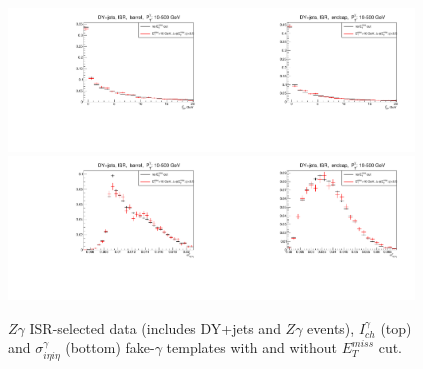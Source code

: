 \begin{figure}[htb]
  \begin{center}
  \includegraphics[width=0.48\textwidth]{../figs/figs_v11/ChannelsMERGED_ZGamma/QuickChecks/cTemplatesVsWMt_ZjetsISR_phoPFChIsoCorr_BARREL_pt10to500.pdf}\includegraphics[width=0.48\textwidth]{../figs/figs_v11/ChannelsMERGED_ZGamma/QuickChecks/cTemplatesVsWMt_ZjetsISR_phoPFChIsoCorr_ENDCAP_pt10to500.pdf}\\
  \includegraphics[width=0.48\textwidth]{../figs/figs_v11/ChannelsMERGED_ZGamma/QuickChecks/cTemplatesVsWMt_ZjetsISR_phoSigmaIEtaIEta_BARREL_pt10to500.pdf}\includegraphics[width=0.48\textwidth]{../figs/figs_v11/ChannelsMERGED_ZGamma/QuickChecks/cTemplatesVsWMt_ZjetsISR_phoSigmaIEtaIEta_ENDCAP_pt10to500.pdf}\\
  \caption{$Z\gamma$ ISR-selected data (includes DY+jets and $Z\gamma$ events), $I_{ch}^\gamma$ (top) and $\sigma_{i \eta i \eta}^\gamma$ (bottom) fake-$\gamma$ templates with and without $E_T^{miss}$ cut.}
  \label{fig:templatesVsWMt_Zg_CHISO_fake}
  \end{center}
\end{figure}

